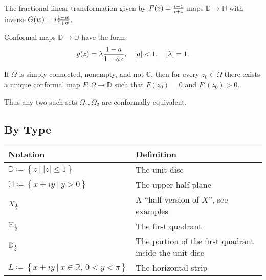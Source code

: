 \begin{theorem}

The fractional linear transformation given by
\(F(z) = {i - z \over i + z}\) maps \({\mathbb{D}}\to {\mathbb{H}}\)
with inverse \(G(w) = i {1-w \over 1 + w}\).

\end{theorem}

\begin{theorem}

Conformal maps \({\mathbb{D}}\to{\mathbb{D}}\) have the form
\begin{align*}
g(z) = \lambda {1-a \over 1 - \mkern 1.5mu\overline{\mkern-1.5mua\mkern-1.5mu}\mkern 1.5mu z}, \quad {\left\lvert {a} \right\rvert} < 1, \quad {\left\lvert {\lambda} \right\rvert} = 1
.\end{align*}

\end{theorem}

\begin{theorem}

If \(\Omega\) is simply connected, nonempty, and not \({\mathbb{C}}\),
then for every \(z_{0}\in \Omega\) there exists a unique conformal map
\(F:\Omega \to {\mathbb{D}}\) such that \(F(z_{0}) = 0\) and
\(F'(z_{0}) > 0\).

Thus any two such sets \(\Omega_{1}, \Omega_{2}\) are conformally
equivalent.

\end{theorem}

\hypertarget{by-type}{%
\subsection{By Type}\label{by-type}}

\begin{remark}[Notation]

\begin{longtable}[]{@{}
  >{\raggedright\arraybackslash}p{}
  >{\raggedright\arraybackslash}p{}@{}}
\toprule
Notation & Definition \\
\midrule
\endhead
\({\mathbb{D}}\coloneqq\left\{{z {~\mathrel{\Big|}~}{\left\lvert {z} \right\rvert} \leq 1}\right\}\)
& The unit disc \\
\({\mathbb{H}}\coloneqq\left\{{x+iy {~\mathrel{\Big|}~}y > 0}\right\}\)
& The upper half-plane \\
\(X_{1\over 2}\) & A ``half version of \(X\)'', see examples \\
\({\mathbb{H}}_{1\over 2}\) & The first quadrant \\
\({\mathbb{D}}_{1\over 2}\) & The portion of the first quadrant inside
the unit disc \\
\(L \coloneqq\left\{{x + iy {~\mathrel{\Big|}~}x\in {\mathbb{R}},\, 0<y<\pi}\right\}\)
& The horizontal strip \\
\bottomrule
\end{longtable}

\end{remark}

